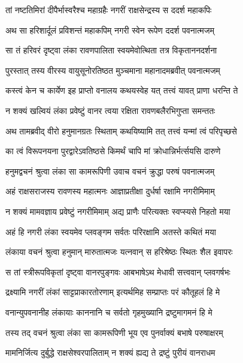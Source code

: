 \twolineshloka
{तां नष्टतिमिरां दीपैर्भास्वरैश्च महाग्रहैः}
{नगरीं राक्षसेन्द्रस्य स ददर्श महाकपिः} %

\twolineshloka
{अथ सा हरिशार्दूलं प्रविशन्तं महाकपिम्}
{नगरी स्वेन रूपेण ददर्श पवनात्मजम्} %

\twolineshloka
{सा तं हरिवरं दृष्ट्वा लंका रावणपालिता}
{स्वयमेवोत्थिता तत्र विकृताननदर्शना} %

\twolineshloka
{पुरस्तात् तस्य वीरस्य वायुसूनोरतिष्ठत}
{मुञ्चमाना महानादमब्रवीत् पवनात्मजम्} %

\twolineshloka
{कस्त्वं केन च कार्येण इह प्राप्तो वनालय}
{कथयस्वेह यत् तत्त्वं यावत् प्राणा धरन्ति ते} %

\twolineshloka
{न शक्यं खल्वियं लंका प्रवेष्टुं वानर त्वया}
{रक्षिता रावणबलैरभिगुप्ता समन्ततः} %

\twolineshloka
{अथ तामब्रवीद् वीरो हनुमानग्रतः स्थिताम्}
{कथयिष्यामि तत् तत्त्वं यन्मां त्वं परिपृच्छसे} %

\twolineshloka
{का त्वं विरूपनयना पुरद्वारेऽवतिष्ठसे}
{किमर्थं चापि मां क्रोधान्निर्भर्त्सयसि दारुणे} %

\twolineshloka
{हनुमद्वचनं श्रुत्वा लंका सा कामरूपिणी}
{उवाच वचनं क्रुद्धा परुषं पवनात्मजम्} %

\twolineshloka
{अहं राक्षसराजस्य रावणस्य महात्मनः}
{आज्ञाप्रतीक्षा दुर्धर्षा रक्षामि नगरीमिमाम्} %

\twolineshloka
{न शक्यं मामवज्ञाय प्रवेष्टुं नगरीमिमाम्}
{अद्य प्राणैः परित्यक्तः स्वप्स्यसे निहतो मया} %

\twolineshloka
{अहं हि नगरी लंका स्वयमेव प्लवङ्गम}
{सर्वतः परिरक्षामि अतस्ते कथितं मया} %

\twolineshloka
{लंकाया वचनं श्रुत्वा हनुमान् मारुतात्मजः}
{यत्नवान् स हरिश्रेष्ठः स्थितः शैल इवापरः} %

\twolineshloka
{स तां स्त्रीरूपविकृतां दृष्ट्वा वानरपुङ्गवः}
{आबभाषेऽथ मेधावी सत्त्ववान् प्लवगर्षभः} %

\twolineshloka
{द्रक्ष्यामि नगरीं लंकां साट्टप्राकारतोरणाम्}
{इत्यर्थमिह सम्प्राप्तः परं कौतूहलं हि मे} %

\twolineshloka
{वनान्युपवनानीह लंकायाः काननानि च}
{सर्वतो गृहमुख्यानि द्रष्टुमागमनं हि मे} %

\twolineshloka
{तस्य तद् वचनं श्रुत्वा लंका सा कामरूपिणी}
{भूय एव पुनर्वाक्यं बभाषे परुषाक्षरम्} %

\twolineshloka
{मामनिर्जित्य दुर्बुद्धे राक्षसेश्वरपालिताम्}
{न शक्यं ह्यद्य ते द्रष्टुं पुरीयं वानराधम} %

